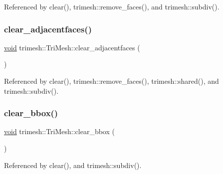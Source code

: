Referenced by clear(), trimesh\+::remove\+\_\+faces(), and trimesh\+::subdiv().

\mbox{\label{classtrimesh_1_1TriMesh_aecd83e291489afef14a14c5f7135d8b8}} 
\subsubsection{\texorpdfstring{clear\+\_\+adjacentfaces()}{clear\_adjacentfaces()}}
{\footnotesize\ttfamily \hyperlink{namespacetrimesh_a784ddfd979e1c579bda795a8edfc3f43}{void} trimesh\+::\+Tri\+Mesh\+::clear\+\_\+adjacentfaces (\begin{DoxyParamCaption}{ }\end{DoxyParamCaption})\hspace{0.3cm}{\ttfamily [inline]}}



Referenced by clear(), trimesh\+::remove\+\_\+faces(), trimesh\+::shared(), and trimesh\+::subdiv().

\mbox{\label{classtrimesh_1_1TriMesh_a32dd81027a1e6f9a10e854361b61d06d}} 
\subsubsection{\texorpdfstring{clear\+\_\+bbox()}{clear\_bbox()}}
{\footnotesize\ttfamily \hyperlink{namespacetrimesh_a784ddfd979e1c579bda795a8edfc3f43}{void} trimesh\+::\+Tri\+Mesh\+::clear\+\_\+bbox (\begin{DoxyParamCaption}{ }\end{DoxyParamCaption})\hspace{0.3cm}{\ttfamily [inline]}}



Referenced by clear(), and trimesh\+::subdiv().

\mbox{\label{classtrimesh_1_1TriMesh_a3f1eb523e86f8bdbde9a5c8a1b0b9097}} 
